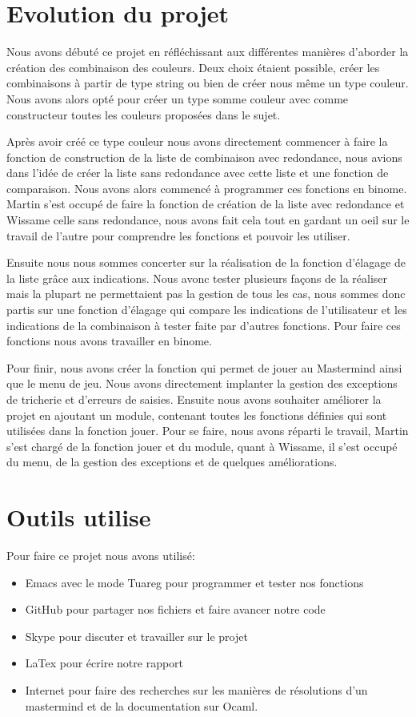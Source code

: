 \documentclass[a4paper,twoside,12pt]{report}
\begin{document}
\section{Evolution du projet}
% 
\par
Nous avons débuté ce projet en réfléchissant aux différentes manières d'aborder la création des combinaison des couleurs. Deux choix étaient possible, créer les combinaisons à partir de type string ou bien de créer nous même un type couleur. Nous avons alors opté pour créer un type somme couleur avec comme constructeur toutes les couleurs proposées dans le sujet. 
\par
Après avoir créé ce type couleur nous avons directement commencer à faire la fonction de construction de la liste de combinaison avec redondance, nous avions dans l'idée de créer la liste sans redondance avec cette liste et une fonction de comparaison. Nous avons alors commencé à programmer ces fonctions en binome. Martin s'est occupé de faire la fonction de création de la liste avec redondance et Wissame celle sans redondance, nous avons fait cela tout en gardant un oeil sur le travail de l'autre pour comprendre les fonctions et pouvoir les utiliser.
\par 
Ensuite nous nous sommes concerter sur la réalisation de la fonction d'élagage de la liste grâce aux indications. Nous avonc tester plusieurs façons de la réaliser mais la plupart ne permettaient pas la gestion de tous les cas, nous sommes donc partis sur une fonction d'élagage qui compare les indications de l'utilisateur et les indications de la combinaison à tester faite par d'autres fonctions. Pour faire ces fonctions nous avons travailler en binome.
\par
Pour finir, nous avons créer la fonction qui permet de jouer au Mastermind ainsi que le menu de jeu. Nous avons directement implanter la gestion des exceptions de tricherie et d'erreurs de saisies. Ensuite nous avons souhaiter améliorer la projet en ajoutant un module, contenant toutes les fonctions définies qui sont utilisées dans la fonction jouer. Pour se faire, nous avons réparti le travail, Martin s'est chargé de la fonction jouer et du module, quant à Wissame, il s'est occupé du menu, de la gestion des exceptions et de quelques améliorations.
\section{Outils utilise}
% 
Pour faire ce projet nous avons utilisé:
\begin{itemize}
\item Emacs avec le mode Tuareg pour programmer et tester nos fonctions
\item GitHub pour partager nos fichiers et faire avancer notre code
\item Skype pour discuter et travailler sur le projet
\item LaTex pour écrire notre rapport
\item Internet pour faire des recherches sur les manières de résolutions d'un mastermind et de la documentation sur Ocaml.
\end{itemize}
\end{document}
